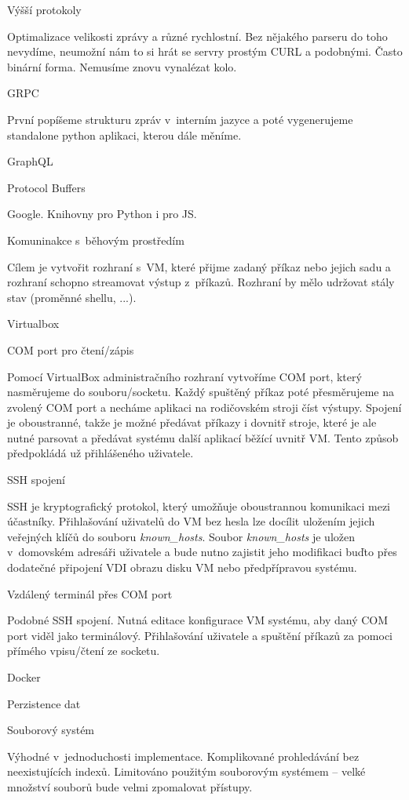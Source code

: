 \secc Výšší protokoly

Optimalizace velikosti zprávy a různé rychlostní.
Bez nějakého parseru do toho nevydíme, neumožní nám to si hrát se servry prostým CURL a podobnými.
Často binární forma.
Nemusíme znovu vynalézat kolo.

\seccc GRPC

První popíšeme strukturu zpráv v~interním jazyce a poté vygenerujeme standalone python aplikaci, kterou dále měníme.

\seccc GraphQL

\seccc Protocol Buffers

Google. Knihovny pro Python i pro JS.

\sec Komuninakce s~běhovým prostředím

Cílem je vytvořit rozhraní s~VM, které přijme zadaný příkaz nebo jejich sadu a rozhraní schopno streamovat výstup z~příkazů.
Rozhraní by mělo udržovat stály stav (proměnné shellu, ...).

\secc Virtualbox

\seccc COM port pro čtení/zápis

Pomocí VirtualBox administračního rozhraní vytvoříme COM port, který nasměrujeme do souboru/socketu.
Každý spuštěný příkaz poté přesměrujeme na zvolený COM port a necháme aplikaci na rodičovském stroji číst výstupy.
Spojení je oboustranné, takže je možné předávat příkazy i dovnitř stroje, které je ale nutné parsovat a předávat systému další aplikací běžící uvnitř VM.
Tento způsob předpokládá už přihlášeného uživatele.

\seccc SSH spojení

SSH je kryptografický protokol, který umožňuje oboustrannou komunikaci mezi účastníky.
Přihlašování uživatelů do VM bez hesla lze docílit uložením jejich veřejných klíčů do souboru {\it known\_hosts}.
Soubor {\it known\_hosts} je uložen v~domovském adresáři uživatele a bude nutno zajistit jeho modifikaci buďto přes dodatečné připojení VDI obrazu disku VM nebo předpřípravou systému.

\seccc Vzdálený terminál přes COM port

Podobné SSH spojení.
Nutná editace konfigurace VM systému, aby daný COM port viděl jako terminálový.
Přihlašování uživatele a spuštění příkazů za pomoci přímého vpisu/čtení ze socketu.

\secc Docker

\sec Perzistence dat

\secc Souborový systém

Výhodné v~jednoduchosti implementace.
Komplikované prohledávání bez neexistujících indexů.
Limitováno použitým souborovým systémem -- velké množství souborů bude velmi zpomalovat přístupy.

